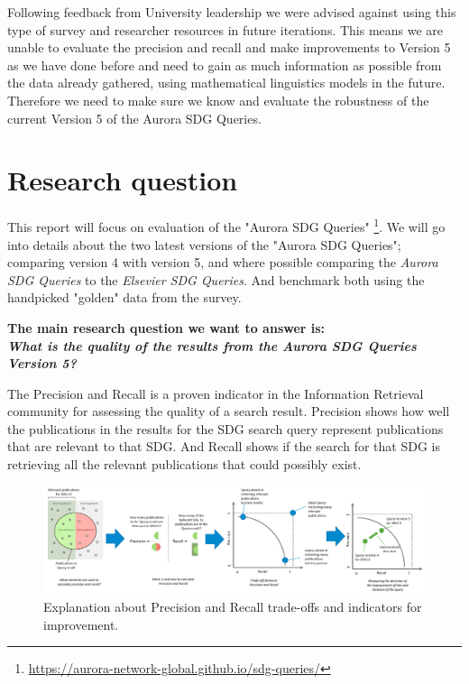 \documentclass{article}
\begin{document}
Following feedback from University leadership we were advised against using this type of survey and researcher resources in future iterations. This means we are unable to evaluate the precision and recall and make improvements to Version 5 as we have done before and need to gain as much information as possible from the data already gathered, using mathematical linguistics models in the future. Therefore we need to make sure we know and evaluate the robustness of the current Version 5 of the Aurora SDG Queries.

\section{Research question}
\label{sec:research-question}

This report will focus on evaluation of the "Aurora SDG Queries" \footnote{\url{https://aurora-network-global.github.io/sdg-queries/} }. We will go into details about the two latest versions of the "Aurora SDG Queries"; comparing version 4 with version 5, and where possible comparing the \emph{Aurora SDG Queries} to the \emph{Elsevier SDG Queries}. And benchmark both using the handpicked "golden" data from the survey. 

\textbf{The main research question we want to answer is:  \\
\emph{What is the quality of the results from the Aurora SDG Queries Version 5?}}

The Precision and Recall is a proven indicator in the Information Retrieval community for assessing the quality of a search result. Precision shows how well the publications in the results for the SDG search query represent publications that are relevant to that SDG. And Recall shows if the search for that SDG is retrieving all the relevant publications that could possibly exist.

\begin{figure}[ht]
	\centering
  \includegraphics[width=1.0\textwidth]{figures/recall-precision.png}
	\caption{Explanation about Precision and Recall trade-offs and indicators for improvement.}
	\label{precisonandrecallexplanation}
\end{figure}
\end{document}
